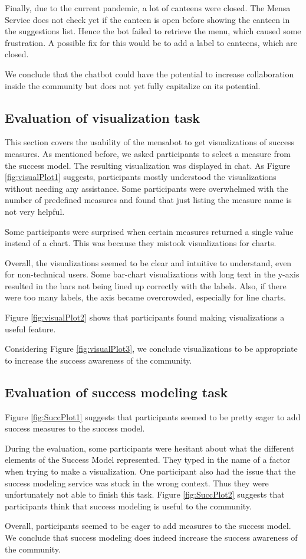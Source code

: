 Finally, due to the current pandemic, a lot of canteens were closed. The Mensa Service does not check yet if the canteen is open before showing the canteen in the suggestions list. Hence the bot failed to retrieve the menu, which caused some frustration. A possible fix for this would be to add a label to canteens, which are closed.


We conclude that the chatbot could have the potential to increase collaboration inside the community but does not yet fully capitalize on its potential. 

\subsection{Evaluation of visualization task}

This section covers the usability of the mensabot to get visualizations of success measures. As mentioned before, we asked participants to select a measure from the success model. The resulting visualization was displayed in chat. As Figure \ref{fig:visualPlot1} suggests, participants mostly understood the visualizations without needing any assistance. Some participants were overwhelmed with the number of predefined measures and found that just listing the measure name is not very helpful. 

Some participants were surprised when certain measures returned a single value instead of a chart. This was because they mistook visualizations for charts. 

Overall, the visualizations seemed to be clear and intuitive to understand, even for non-technical users. Some bar-chart visualizations with long text in the y-axis resulted in the bars not being lined up correctly with the labels. Also, if there were too many labels, the axis became overcrowded, especially for line charts.

Figure \ref{fig:visualPlot2} shows that participants found making visualizations a useful feature. 

Considering Figure \ref{fig:visualPlot3}, we conclude visualizations to be appropriate to increase the success awareness of the community.

\subsection{Evaluation of success modeling task}
Figure \ref{fig:SuccPlot1} suggests that participants seemed to be pretty eager to add success measures to the success model.

During the evaluation, some participants were hesitant about what the different elements of the Success Model represented. They typed in the name of a factor when trying to make a visualization.
One participant also had the issue that the success modeling service was stuck in the wrong context. Thus they were unfortunately not able to finish this task.
Figure \ref{fig:SuccPlot2} suggests that participants think that success modeling is useful to the community.

Overall, participants seemed to be eager to add measures to the success model.
We conclude that success modeling does indeed increase the success awareness of the community. 

